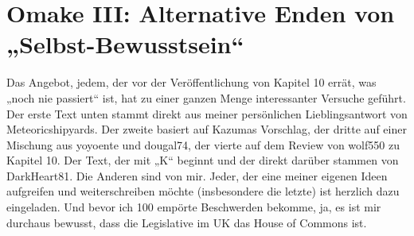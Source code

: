









\section{Omake III: Alternative Enden von „Selbst-Bewusstsein“}

Das Angebot, jedem, der vor der Veröffentlichung von Kapitel 10 errät, was „noch nie passiert“ ist, hat zu einer ganzen Menge interessanter Versuche geführt. Der erste Text unten stammt direkt aus meiner persönlichen Lieblingsantwort von Meteoricshipyards. Der zweite basiert auf Kazumas Vorschlag, der dritte auf einer Mischung aus yoyoente und dougal74, der vierte auf dem Review von wolf550 zu Kapitel 10. Der Text, der mit „K“ beginnt und der direkt darüber stammen von DarkHeart81. Die Anderen sind von mir. Jeder, der eine meiner eigenen Ideen aufgreifen und weiterschreiben möchte (insbesondere die letzte) ist herzlich dazu eingeladen. Und bevor ich 100 empörte Beschwerden bekomme, ja, es ist mir durchaus bewusst, dass die Legislative im UK das House of Commons ist.

